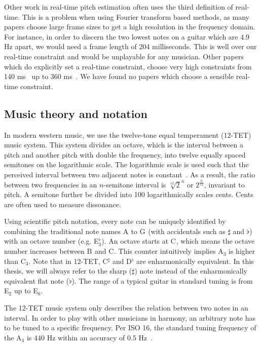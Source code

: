 \documentclass[10pt,twocolumn]{article}
\newcommand{\note}[2]{#1${}_{#2}$}
\newcommand{\notesharp}[2]{#1${}_{#2}^{\sharp}$}
\newcommand{\noteflat}[2]{#1${}_{#2}^{\flat}$}
\begin{document}
Other work in real-time pitch estimation often uses the third definition of real-time. This is a problem when using Fourier transform based methods, as many papers choose large frame sizes to get a high resolution in the frequency domain. For instance, in order to discern the two lowest notes on a guitar which are 4.9 Hz apart, we would need a frame length of 204 milliseconds. This is well over our real-time constraint and would be unplayable for any musician. Other papers which do explicitly set a real-time constraint, choose very high constraints from 140 ms~\cite{sloomboi} up to 360 ms~\cite{sloomboi2}. We have found no papers which choose a sensible real-time constraint.

\subsection{Music theory and notation}
In modern western music, we use the twelve-tone equal temperament (12-TET) music system. This system divides an octave, which is the interval between a pitch and another pitch with double the frequency, into twelve equally spaced semitones on the logarithmic scale. The logarithmic scale is used such that the perceived interval between two adjacent notes is constant~\cite{perception}. As a result, the ratio between two frequencies in an $n$-semitone interval is $\sqrt[12]{2}^n$ or $2^{\frac{n}{12}}$, invariant to pitch. A semitone further be divided into 100 logarithmically scales cents. Cents are often used to measure dissonance.

Using scientific pitch notation, every note can be uniquely identified by combining the traditional note names \note{A}{} to \note{G}{} (with accidentals such as $\sharp$ and $\flat$) with an octave number (e.g. \noteflat{E}{3}). An octave starts at \note{C}{}, which means the octave number increases between \note{B}{} and \note{C}{}. This counter intuitively implies \note{A}{3} is higher than \note{C}{3}. Note that in 12-TET, \notesharp{C}{} and \noteflat{D}{} are enharmonically equivalent. In this thesis, we will always refer to the sharp ($\sharp$) note instead of the enharmonically equivalent flat note ($\flat$). %
The range of a typical guitar in standard tuning is from \note{E}{2} up to \note{E}{6}.

The 12-TET music system only describes the relation between two notes in an interval. In order to play with other musicians in harmony, an arbitrary note has to be tuned to a specific frequency. Per ISO 16, the standard tuning frequency of the \note{A}{4} is 440 Hz within an accuracy of 0.5 Hz~\cite{isoa}.
\end{document}
